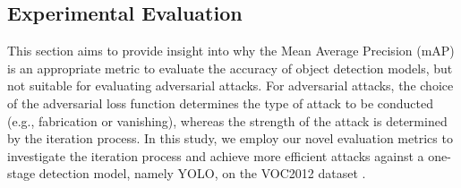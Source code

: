 






\subsection{Experimental Evaluation}

This section aims to provide insight into why the Mean Average Precision (mAP) is an appropriate metric to evaluate the accuracy of object detection models, but not suitable for evaluating adversarial attacks. For adversarial attacks, the choice of the adversarial loss function determines the type of attack to be conducted (e.g., fabrication or vanishing), whereas the strength of the attack is determined by the iteration process. In this study, we employ our novel evaluation metrics to investigate the iteration process and achieve more efficient attacks against a one-stage detection model, namely YOLO, on the VOC2012 dataset \citep{pascal-voc-2012}.

